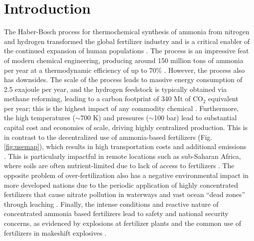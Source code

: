 \section{Introduction}

The Haber-Bosch process for thermochemical synthesis of ammonia from nitrogen and hydrogen transformed the global fertilizer industry and is a critical enabler of the continued expansion of human populations \cite{Smil_1999}. The process is an impressive feat of modern chemical engineering, producing around 150 million tons of ammonia per year at a thermodynamic efficiency of up to 70\% \cite{Schloegl_2003,Schiffer_2017}. However, the process also has downsides. The scale of the process leads to massive energy consumption of 2.5 exajoule per year, and the hydrogen feedstock is typically obtained via methane reforming, leading to a carbon footprint of 340 Mt of CO$_2$ equivalent per year; this is the highest impact of any commodity chemical \cite{Schiffer_2017}. Furthermore, the high temperatures ($\sim$700 K) and pressures ($\sim$100 bar) lead to substantial capital cost and economies of scale, driving highly centralized production. This is in contrast to the decentralized use of ammonia-based fertilizers (Fig. \ref{fig:usemap}), which results in high transportation costs and additional emissions \cite{West_2002}. This is particularly impactful in remote locations such as sub-Saharan Africa, where soils are often nutrient-limited due to lack of access to fertilizers \cite{Gilbert_2012, Mueller_2012}. The opposite problem of over-fertilization also has a negative environmental impact in more developed nations due to the periodic application of highly concentrated fertilizers that cause nitrate pollution in waterways and vast ocean ``dead zones'' through leaching \cite{Diaz2008}. Finally, the intense conditions and reactive nature of concentrated ammonia based fertilizers lead to safety and national security concerns, as evidenced by explosions at fertilizer plants and the common use of fertilizers in makeshift explosives \cite{Marlair_2005}.


